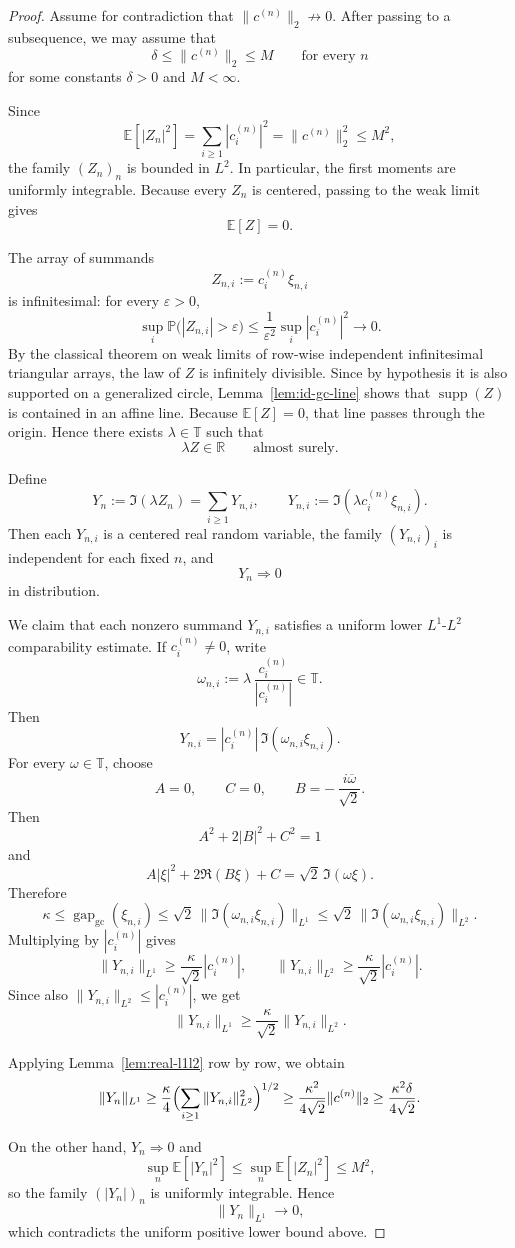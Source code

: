 \documentclass[11pt]{amsart}
\newcommand{\E}{\mathbb{E}}
\newcommand{\R}{\mathbb{R}}
\newcommand{\T}{\mathbb{T}}
\newcommand{\supp}{\operatorname{supp}}
\newcommand{\gapgc}{\operatorname{gap}_{\mathrm{gc}}}
\begin{document}
\begin{proof}
Assume for contradiction that $\|c^{(n)}\|_2\not\to 0$.  After passing to a
subsequence, we may assume that
\[
  \delta \le \|c^{(n)}\|_2 \le M
  \qquad\text{for every } n
\]
for some constants $\delta>0$ and $M<\infty$.

Since
\[
  \E[|Z_n|^2]=\sum_{i\ge 1} |c_i^{(n)}|^2 = \|c^{(n)}\|_2^2 \le M^2,
\]
the family $(Z_n)_n$ is bounded in $L^2$.  In particular, the first moments are
uniformly integrable.  Because every $Z_n$ is centered, passing to the weak
limit gives
\[
  \E[Z]=0.
\]

The array of summands
\[
  Z_{n,i}:=c_i^{(n)}\xi_{n,i}
\]
is infinitesimal: for every $\varepsilon>0$,
\[
  \sup_i \mathbb P\bigl(|Z_{n,i}|>\varepsilon\bigr)
  \le
  \frac{1}{\varepsilon^2}\sup_i |c_i^{(n)}|^2
  \longrightarrow 0.
\]
By the classical theorem on weak limits of row-wise independent infinitesimal
triangular arrays, the law of $Z$ is infinitely divisible.  Since by hypothesis
it is also supported on a generalized circle, Lemma~\ref{lem:id-gc-line} shows
that $\supp(Z)$ is contained in an affine line.  Because $\E[Z]=0$, that line
passes through the origin.  Hence there exists $\lambda\in\T$ such that
\[
  \lambda Z \in \R
  \qquad\text{almost surely.}
\]

Define
\[
  Y_n := \Im(\lambda Z_n)
  = \sum_{i\ge 1} Y_{n,i},
  \qquad
  Y_{n,i}:=\Im(\lambda c_i^{(n)}\xi_{n,i}).
\]
Then each $Y_{n,i}$ is a centered real random variable, the family
$(Y_{n,i})_i$ is independent for each fixed $n$, and
\[
  Y_n \Rightarrow 0
\]
in distribution.

We claim that each nonzero summand $Y_{n,i}$ satisfies a uniform lower
$L^1$-$L^2$ comparability estimate.  If $c_i^{(n)}\ne 0$, write
\[
  \omega_{n,i} := \lambda\,\frac{c_i^{(n)}}{|c_i^{(n)}|}\in\T.
\]
Then
\[
  Y_{n,i} = |c_i^{(n)}|\,\Im(\omega_{n,i}\xi_{n,i}).
\]
For every $\omega\in\T$, choose
\[
  A=0,\qquad C=0,\qquad B=-\,\frac{i\overline{\omega}}{\sqrt 2}.
\]
Then
\[
  A^2+2|B|^2+C^2=1
\]
and
\[
  A|\xi|^2+2\Re(B\xi)+C = \sqrt 2\,\Im(\omega\xi).
\]
Therefore
\[
  \kappa
  \le
  \gapgc(\xi_{n,i})
  \le
  \sqrt 2\,\|\Im(\omega_{n,i}\xi_{n,i})\|_{L^1}
  \le
  \sqrt 2\,\|\Im(\omega_{n,i}\xi_{n,i})\|_{L^2}.
\]
Multiplying by $|c_i^{(n)}|$ gives
\[
  \|Y_{n,i}\|_{L^1} \ge \frac{\kappa}{\sqrt 2}|c_i^{(n)}|,
  \qquad
  \|Y_{n,i}\|_{L^2} \ge \frac{\kappa}{\sqrt 2}|c_i^{(n)}|.
\]
Since also $\|Y_{n,i}\|_{L^2}\le |c_i^{(n)}|$, we get
\[
  \|Y_{n,i}\|_{L^1}
  \ge
  \frac{\kappa}{\sqrt 2}\|Y_{n,i}\|_{L^2}.
\]

Applying Lemma~\ref{lem:real-l1l2} row by row, we obtain
\[
  \|Y_n\|_{L^1}
  \ge
  \frac{\kappa}{4}
  \Bigl(\sum_{i\ge 1}\|Y_{n,i}\|_{L^2}^2\Bigr)^{1/2}
  \ge
  \frac{\kappa^2}{4\sqrt 2}\|c^{(n)}\|_2
  \ge
  \frac{\kappa^2\delta}{4\sqrt 2}.
\]

On the other hand, $Y_n\Rightarrow 0$ and
\[
  \sup_n \E[|Y_n|^2] \le \sup_n \E[|Z_n|^2]\le M^2,
\]
so the family $(|Y_n|)_n$ is uniformly integrable.  Hence
\[
  \|Y_n\|_{L^1}\longrightarrow 0,
\]
which contradicts the uniform positive lower bound above.
\end{proof}
\end{document}
